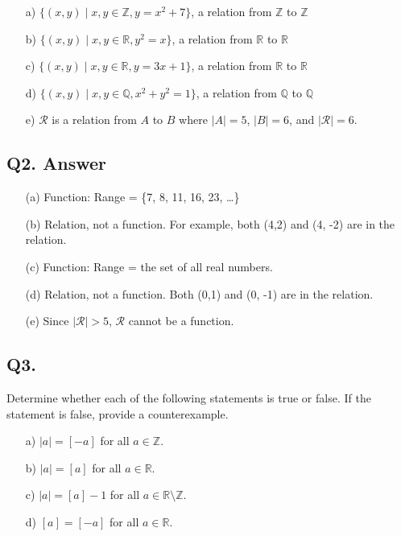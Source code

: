 \documentclass{article}
\begin{document}
\begin{enumerate}
    \item[a)] \( \{ (x, y) \mid x, y \in \mathbb{Z}, y = x^2 + 7 \} \), a relation from \(\mathbb{Z}\) to \(\mathbb{Z}\)
    \item[b)] \( \{ (x, y) \mid x, y \in \mathbb{R}, y^2 = x \} \), a relation from \(\mathbb{R}\) to \(\mathbb{R}\)
    \item[c)] \( \{ (x, y) \mid x, y \in \mathbb{R}, y = 3x + 1 \} \), a relation from \(\mathbb{R}\) to \(\mathbb{R}\)
    \item[d)] \( \{ (x, y) \mid x, y \in \mathbb{Q}, x^2 + y^2 = 1 \} \), a relation from \(\mathbb{Q}\) to \(\mathbb{Q}\)
    \item[e)] \( \mathcal{R} \) is a relation from \( A \) to \( B \) where \( |A| = 5 \), \( |B| = 6 \), and \( |\mathcal{R}| = 6 \).
\end{enumerate}

\newpage

\subsection*{Q2. Answer}
\begin{enumerate}
    \item[(a)] Function: Range = \{7, 8, 11, 16, 23, \ldots\}
    \item[(b)] Relation, not a function. For example, both (4,2) and (4, -2) are in the relation.
    \item[(c)] Function: Range = the set of all real numbers.
    \item[(d)] Relation, not a function. Both (0,1) and (0, -1) are in the relation.
    \item[(e)] Since \( |\mathcal{R}| > 5 \), \( \mathcal{R} \) cannot be a function.
\end{enumerate}
\newpage

\subsection*{Q3.}
Determine whether each of the following statements is true or false. If the statement is false, provide a counterexample.

\begin{enumerate}
    \item[a)] \( |a| = [-a] \) for all \( a \in \mathbb{Z} \).
    \item[b)] \( |a| = [a] \) for all \( a \in \mathbb{R} \).
    \item[c)] \( |a| = [a] - 1 \) for all \( a \in \mathbb{R} \setminus \mathbb{Z} \).
    \item[d)] \( [a] = [-a] \) for all \( a \in \mathbb{R} \).
\end{enumerate}
\newpage
\end{document}
